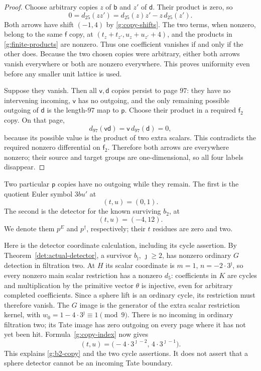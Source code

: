 \begin{proof}
Choose arbitrary copies $z$ of $\mathsf b$ and $z'$
of $\mathsf d$.  Their product is zero, so
\[
 0=d_{25}(zz')=d_{25}(z)z'-z\,d_{25}(z').
\]
Both arrows have shift $(-1,4)$ by
\eqref{g:copy-shifts}.  The two terms, when nonzero,
belong to the same $\mathsf f$ copy, at
$(t_z+t_{z'},u_z+u_{z'}+4)$, and the products in
\eqref{g:finite-products} are nonzero.  Thus one
coefficient vanishes if and only if the other does.
Because the two chosen copies were arbitrary, either
both arrows vanish everywhere or both are nonzero
everywhere.  This proves uniformity even before any
smaller unit lattice is used.

Suppose they vanish.  Then all $\mathsf v,\mathsf d$
copies persist to page $97$: they have no intervening
incoming, $\mathsf v$ has no outgoing, and the only
remaining possible outgoing of $\mathsf d$ is the
length-$97$ map to $\mathsf p$.  Choose their product
in a required $\mathsf f_2$ copy.  On that page,
\[
 d_{97}(\mathsf v\mathsf d)
   =\mathsf v\,d_{97}(\mathsf d)=0,
\]
because its possible value is the product of two
extra scalars.  This contradicts the required
nonzero differential on $\mathsf f_2$.  Therefore
both arrows are everywhere nonzero; their source
and target groups are one-dimensional, so all four
labels disappear.
\end{proof}

Two particular $\mathsf p$ copies have no outgoing while
they remain.  The first is the quotient Euler symbol
$3bu'$ at
\begin{equation}\label{g:Euler-copy}
 (t,u)=(0,1).
\end{equation}
The second is the detector for the known surviving
$b_2$, at
\begin{equation}\label{g:b2-copy}
 (t,u)=(-4,12).
\end{equation}
We denote them $p^E$ and $p^\dagger$, respectively;
their $t$ residues are zero and two.

Here is the detector coordinate calculation, including its
cycle assertion.  By Theorem~\ref{det:actual-detector},
a survivor $b_{\jmath}$, $\jmath\ge2$, has nonzero
ordinary $G$ detection in filtration two.  At $H$ its
scalar coordinate is $m=1$, $n=-2\cdot3^{\jmath}$,
so every nonzero main scalar restriction has a nonzero $d_5$:
coefficients in $K$ are cycles and multiplication by the
primitive vector $\theta$ is injective, even for arbitrary
completed coefficients.  Since a sphere lift is an ordinary cycle, its
restriction must therefore vanish.  The $G$ image is
the generator of the extra scalar restriction kernel,
with $w_0=1-4\cdot3^{\jmath}\equiv1\pmod9$.
There is no incoming in ordinary filtration two; its
Tate image has zero outgoing on every page where it
has not yet been hit.  Formula~\eqref{g:copy-index}
now gives
\begin{equation}\label{g:detector-coordinates}
 (t,u)=
 \bigl(-4\cdot3^{\jmath-2},\,4\cdot3^{\jmath-1}\bigr).
\end{equation}
This explains \eqref{g:b2-copy} and the two cycle
assertions.  It does not assert that a sphere detector
cannot be an incoming Tate boundary.

